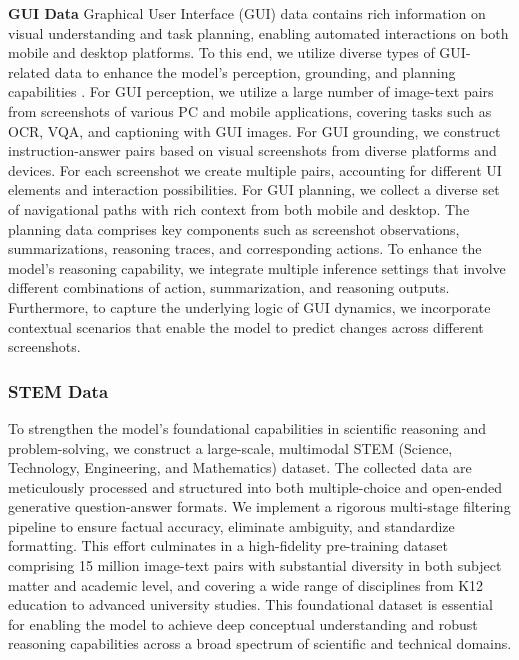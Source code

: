 \documentclass{article}
\begin{document}
\textbf{GUI Data}
Graphical User Interface (GUI) data contains rich information on visual understanding and task planning, enabling automated interactions on both mobile and desktop platforms. To this end, we utilize diverse types of GUI-related data to enhance the model’s perception, grounding, and planning capabilities \citep{zeng2025uitron}.
For GUI perception, we utilize a large number of image-text pairs from screenshots of various PC and mobile applications, covering tasks such as OCR, VQA, and captioning with GUI images. For GUI grounding, we construct instruction-answer pairs based on visual screenshots from diverse platforms and devices. For each screenshot we create multiple pairs, accounting for different UI elements and interaction possibilities.
For GUI planning, we collect a diverse set of navigational paths with rich context from both mobile and desktop. The planning data comprises key components such as screenshot observations, summarizations, reasoning traces, and corresponding actions. To enhance the model’s reasoning capability, we integrate multiple inference settings that involve different combinations of action, summarization, and reasoning outputs. 
Furthermore, to capture the underlying logic of GUI dynamics, we incorporate contextual scenarios that enable the model to predict changes across different screenshots.

\subsubsection{STEM Data} \label{sec:pretrain_stem_data}
To strengthen the model’s foundational capabilities in scientific reasoning and problem-solving, we construct a large-scale, multimodal STEM (Science, Technology, Engineering, and Mathematics) dataset.
The collected data are meticulously processed and structured into both multiple-choice and open-ended generative question-answer formats.
We implement a rigorous multi-stage filtering pipeline to ensure factual accuracy, eliminate ambiguity, and standardize formatting.
This effort culminates in a high-fidelity pre-training dataset comprising 15 million image-text pairs with substantial diversity in both subject matter and academic level, and covering a wide range of disciplines from K12 education to advanced university studies.
This foundational dataset is essential for enabling the model to achieve deep conceptual understanding and robust reasoning capabilities across a broad spectrum of scientific and technical domains.
\end{document}
